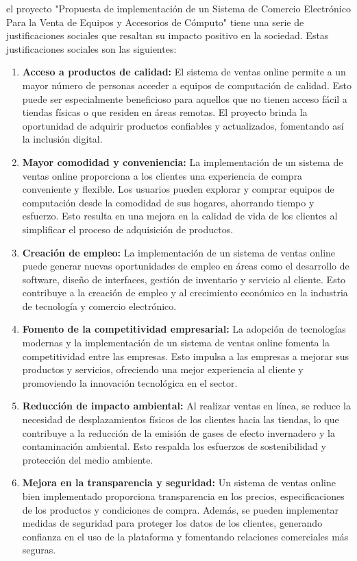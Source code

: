 \documentclass[12pt,a4paper]{article}
\newcommand{\titulo}{"Propuesta de implementación de un Sistema de Comercio Electrónico Para la Venta de Equipos y Accesorios de Cómputo" }
\begin{document}
el proyecto \titulo tiene una serie de justificaciones sociales que resaltan su impacto positivo en la sociedad. Estas justificaciones sociales son las siguientes:
\begin{enumerate}
\item \textbf{Acceso a productos de calidad:} El sistema de ventas online permite a un mayor número de personas acceder a equipos de computación de calidad. Esto puede ser especialmente beneficioso para aquellos que no tienen acceso fácil a tiendas físicas o que residen en áreas remotas. El proyecto brinda la oportunidad de adquirir productos confiables y actualizados, fomentando así la inclusión digital.
\item \textbf{Mayor comodidad y conveniencia:} La implementación de un sistema de ventas online proporciona a los clientes una experiencia de compra conveniente y flexible. Los usuarios pueden explorar y comprar equipos de computación desde la comodidad de sus hogares, ahorrando tiempo y esfuerzo. Esto resulta en una mejora en la calidad de vida de los clientes al simplificar el proceso de adquisición de productos.
\item \textbf{Creación de empleo:} La implementación de un sistema de ventas online puede generar nuevas oportunidades de empleo en áreas como el desarrollo de software, diseño de interfaces, gestión de inventario y servicio al cliente. Esto contribuye a la creación de empleo y al crecimiento económico en la industria de tecnología y comercio electrónico.
\item \textbf{Fomento de la competitividad empresarial:} La adopción de tecnologías modernas y la implementación de un sistema de ventas online fomenta la competitividad entre las empresas. Esto impulsa a las empresas a mejorar sus productos y servicios, ofreciendo una mejor experiencia al cliente y promoviendo la innovación tecnológica en el sector.
\item \textbf{Reducción de impacto ambiental:} Al realizar ventas en línea, se reduce la necesidad de desplazamientos físicos de los clientes hacia las tiendas, lo que contribuye a la reducción de la emisión de gases de efecto invernadero y la contaminación ambiental. Esto respalda los esfuerzos de sostenibilidad y protección del medio ambiente.
\item \textbf{Mejora en la transparencia y seguridad:} Un sistema de ventas online bien implementado proporciona transparencia en los precios, especificaciones de los productos y condiciones de compra. Además, se pueden implementar medidas de seguridad para proteger los datos de los clientes, generando confianza en el uso de la plataforma y fomentando relaciones comerciales más seguras.
\end{enumerate}
\end{document}
